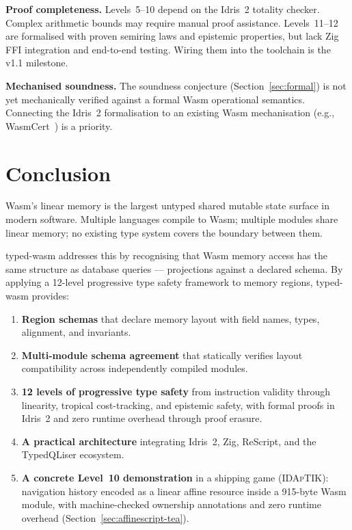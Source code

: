 \documentclass[sigplan,nonacm,screen]{acmart}
\begin{document}
\textbf{Proof completeness.}
Levels~5--10 depend on the Idris~2 totality checker. Complex arithmetic
bounds may require manual proof assistance. Levels~11--12 are formalised
with proven semiring laws and epistemic properties, but lack Zig FFI
integration and end-to-end testing. Wiring them into the toolchain is
the v1.1 milestone.

\textbf{Mechanised soundness.}
The soundness conjecture (Section~\ref{sec:formal}) is not yet
mechanically verified against a formal Wasm operational semantics.
Connecting the Idris~2 formalisation to an existing Wasm mechanisation
(e.g., WasmCert~\cite{watt2018}) is a priority.

\section{Conclusion}
\label{sec:conclusion}

Wasm's linear memory is the largest untyped shared mutable state surface
in modern software. Multiple languages compile to Wasm; multiple modules
share linear memory; no existing type system covers the boundary between
them.

typed-wasm addresses this by recognising that Wasm memory access has the
same structure as database queries --- projections against a declared
schema. By applying a 12-level progressive type safety framework to
memory regions, typed-wasm provides:

\begin{enumerate}
  \item \textbf{Region schemas} that declare memory layout with field
    names, types, alignment, and invariants.
  \item \textbf{Multi-module schema agreement} that statically verifies
    layout compatibility across independently compiled modules.
  \item \textbf{12 levels of progressive type safety} from instruction
    validity through linearity, tropical cost-tracking, and epistemic
    safety, with formal proofs in Idris~2 and zero runtime overhead
    through proof erasure.
  \item \textbf{A practical architecture} integrating Idris~2, Zig,
    ReScript, and the TypedQLiser ecosystem.
  \item \textbf{A concrete Level~10 demonstration} in a shipping game
    (\textsc{IDApTIK}): navigation history encoded as a linear affine
    resource inside a 915-byte Wasm module, with machine-checked ownership
    annotations and zero runtime overhead
    (Section~\ref{sec:affinescript-tea}).
\end{enumerate}
\end{document}
